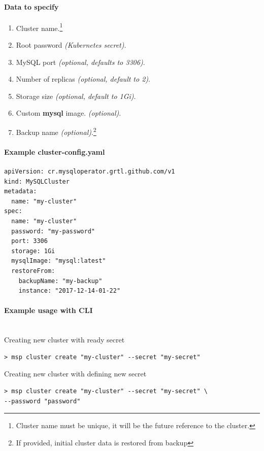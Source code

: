 \paragraph{Data to specify}
\begin{enumerate}
	\item Cluster name.\footnote{Cluster name must be unique, it will be the future reference
	to the cluster.}
	\item Root password \textit{(Kubernetes secret)}.
	\item MySQL port \textit{(optional, defaults to 3306)}.
	\item Number of replicas \textit{(optional, default to 2)}.
	\item Storage size \textit{(optional, default to 1Gi)}.
	\item Custom \textbf{mysql} image. \textit{(optional)}.
	\item Backup name \textit{(optional)}.\footnote{If provided, initial cluster data is restored
	from backup}
\end{enumerate}

\paragraph{Example \textbf{cluster-config.yaml}}
\begin{lstlisting}[caption=cluster-config.yaml,captionpos=b]
apiVersion: cr.mysqloperator.grtl.github.com/v1
kind: MySQLCluster
metadata:
  name: "my-cluster"
spec:
  name: "my-cluster"
  password: "my-password"
  port: 3306
  storage: 1Gi
  mysqlImage: "mysql:latest"
  restoreFrom: 
	backupName: "my-backup"
	instance: "2017-12-14-01-22"
\end{lstlisting}
\paragraph{Example usage with CLI}\mbox{}\\

\noindent Creating new cluster with ready secret

\begin{lstlisting}
> msp cluster create "my-cluster" --secret "my-secret"
\end{lstlisting}

\noindent Creating new cluster with defining new secret

\begin{lstlisting}
> msp cluster create "my-cluster" --secret "my-secret" \
--password "password"
\end{lstlisting}

